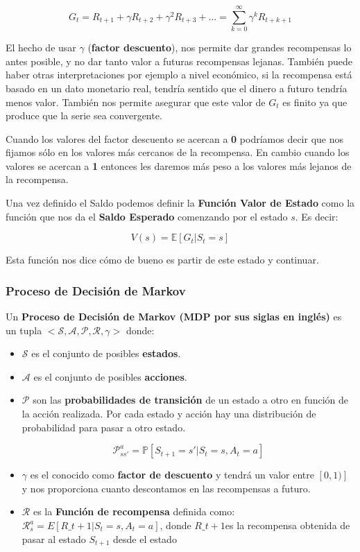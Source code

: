 \documentclass[
  a4paper,
  DIV=11,
  numbers=noendperiod]{scrreprt}
\begin{document}
\[
G_t = R_{t+1} + \gamma R_{t+2} + \gamma^2 R_{t+3} + ... = \sum_{k=0}^\infty\gamma^kR_{t+k+1}
\]

El hecho de usar \(\gamma\) (\textbf{factor descuento}), nos permite dar
grandes recompensas lo antes posible, y no dar tanto valor a futuras
recompensas lejanas. También puede haber otras interpretaciones por
ejemplo a nivel económico, si la recompensa está basado en un dato
monetario real, tendría sentido que el dinero a futuro tendría menos
valor. También nos permite asegurar que este valor de \(G_t\) es finito
ya que produce que la serie sea convergente.

Cuando los valores del factor descuento se acercan a \textbf{0}
podríamos decir que nos fijamos sólo en los valores más cercanos de la
recompensa. En cambio cuando los valores se acercan a \textbf{1}
entonces les daremos más peso a los valores más lejanos de la
recompensa.

Una vez definido el Saldo podemos definir la \textbf{Función Valor de
Estado} como la función que nos da el \textbf{Saldo Esperado} comenzando
por el estado \(s\). Es decir:

\[
V(s) = \mathbb E[G_t|S_t=s]
\]

Esta función nos dice cómo de bueno es partir de este estado y
continuar.

\subsubsection{Proceso de Decisión de
Markov}\label{proceso-de-decisiuxf3n-de-markov}

Un \textbf{Proceso de Decisión de Markov (MDP por sus siglas en inglés)}
es un tupla \(<\mathcal S,\mathcal A,\mathcal P,\mathcal R, \gamma >\)
donde:

\begin{itemize}
\item
  \(\mathcal S\) es el conjunto de posibles \textbf{estados}.
\item
  \(\mathcal A\) es el conjunto de posibles \textbf{acciones}.
\item
  \(\mathcal P\) son las \textbf{probabilidades de transición} de un
  estado a otro en función de la acción realizada. Por cada estado y
  acción hay una distribución de probabilidad para pasar a otro estado.

  \[
  \mathcal P_{ss'}^a=\mathbb P[S_{t+1}=s'|S_t=s,A_t=a]\]
\item
  \(\gamma\) es el conocido como \textbf{factor de descuento} y tendrá
  un valor entre \([0,1)]\) y nos proporciona cuanto descontamos en las
  recompensas a futuro.
\item
  \(\mathcal R\) es la \textbf{Función de recompensa} definida como:
  \(\mathcal R_s^a=E[R\_{t+1}|S_t=s, A_t=a]\), donde \(R\_{t+1}\)es la
  recompensa obtenida de pasar al estado \(S_{t+1}\) desde el estado
\end{itemize}
\end{document}
